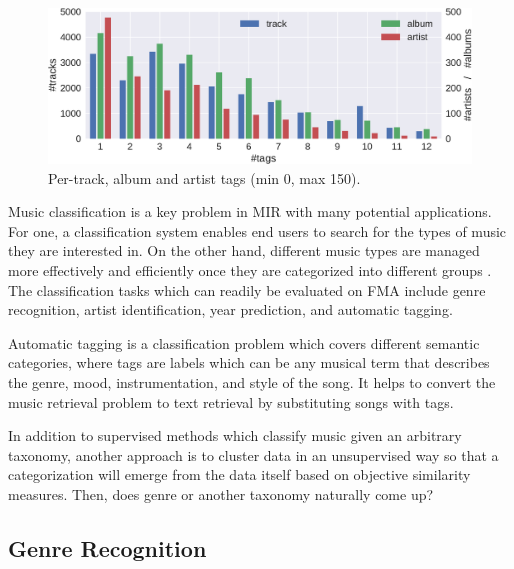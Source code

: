 \documentclass{article}
\begin{document}
\begin{figure}
	\centering
	\includegraphics[width=\linewidth]{tag_distribution.pdf}
	\caption{Per-track, album and artist tags (min 0, max 150).}
	\label{fig:tag_distribution}
\end{figure}

Music classification is a key problem in MIR with many potential applications. For one, a classification system enables end users to search for the types of music they are interested in. On the other hand, different music types are managed more effectively and efficiently once they are categorized into different groups \cite{mir_review_classif}.
The classification tasks which can readily be evaluated on FMA include genre recognition, artist identification, year prediction, and automatic tagging.

Automatic tagging \cite{autotagging} is a classification problem which covers different semantic categories, where tags are labels which can be any musical term that describes the genre, mood, instrumentation, and style of the song.
It helps to convert the music retrieval problem to text retrieval by substituting songs with tags.

In addition to supervised methods which classify music given an arbitrary taxonomy, another approach is to cluster data in an unsupervised way so that a categorization will emerge from the data itself based on objective similarity measures. Then, does genre or another taxonomy naturally come up?

\subsection{Genre Recognition} %
\end{document}
